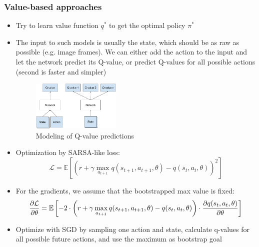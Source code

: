 \subsubsection{Value-based approaches}
\begin{itemize}
	\item Try to learn value function $q^*$ to get the optimal policy $\pi^*$
	\item The input to such models is usually the state, which should be as raw as possible (e.g. image frames). We can either add the action to the input and let the network predict its Q-value, or predict Q-values for all possible actions (second is faster and simpler)
	\begin{figure}[ht!]
		\centering
		\includegraphics[width=0.4\textwidth]{figures/RL_deep_QLearning.png}
		\caption{Modeling of Q-value predictions}
	\end{figure}
	\item Optimization by SARSA-like loss:
	$$\mathcal{L} = \mathbb{E}\left[\left(r + \gamma \max_{a_{t+1}} q(s_{t+1}, a_{t+1}, \theta) -q(s_{t}, a_{t}, \theta) \right)^2\right]$$
	\item For the gradients, we assume that the bootstrapped max value is fixed:
	$$\frac{\partial \mathcal{L}}{\partial \theta} = \mathbb{E}\left[-2\cdot \left(r + \gamma \max_{a_{t+1}} q(s_{t+1}, a_{t+1}, \theta) -q(s_{t}, a_{t}, \theta) \right) \cdot \frac{\partial q(s_{t}, a_{t}, \theta)}{\partial \theta}\right]$$
	\item Optimize with SGD by sampling one action and state, calculate q-values for all possible future actions, and use the maximum as bootstrap goal
\end{itemize}
